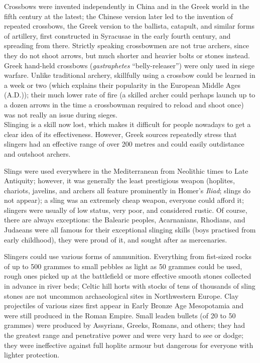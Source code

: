 \documentclass{article}
\begin{document}
Crossbows were invented independently in China and in the Greek world in the fifth century at the latest; the Chinese version later led to the invention of repeated crossbows, the Greek version to the ballista, catapult, and similar forms of artillery, first constructed in Syracusae in the early fourth century, and spreading from there. Strictly speaking crossbowmen are not true archers, since they do not shoot arrows, but much shorter and heavier bolts or stones instead. Greek hand-held crossbows (\textit{gastraphetes} ``belly-releaser'') were only used in siege warfare. Unlike traditional archery, skillfully using a crossbow could be learned in a week or two (which explains their popularity in the European Middle Ages (A.D.)); their much lower rate of fire (a skilled archer could perhaps launch up to a dozen arrows in the time a crossbowman required to reload and shoot once) was not really an issue during sieges.
\\

Slinging is a skill now lost, which makes it difficult for people nowadays to get a clear idea of its effectiveness. However, Greek sources repeatedly stress that slingers had an effective range of over 200 metres and could easily outdistance and outshoot archers. 

Slings were used everywhere in the Mediterranean from Neolithic times to Late Antiquity; however, it was generally the least prestigious weapon (hoplites, chariots, javelins, and archers all feature prominently in Homer's \textit{Iliad}; slings do not appear); a sling was an extremely cheap weapon, everyone could afford it; slingers were usually of low status, very poor, and considered rustic. Of course, there are always exceptions: the Balearic peoples, Acarnanians, Rhodians, and Judaeans were all famous for their exceptional slinging skills (boys practised from early childhood), they were proud of it, and sought after as mercenaries.

Slingers could use various forms of ammunition. Everything from fist-sized rocks of up to 500 grammes to small pebbles as light as 50 grammes could be used, rough ones picked up at the battlefield or more effective smooth stones collected in advance in river beds; Celtic hill horts with stocks of tens of thousands of sling stones are not uncommon archaeological sites in Northwestern Europe. Clay projectiles of various sizes first appear in Early Bronze Age Mesopotamia and were still produced in the Roman Empire. Small leaden bullets (of 20 to 50 grammes) were produced by Assyrians, Greeks, Romans, and others; they had the greatest range and penetrative power and were very hard to see or dodge; they were ineffective against full hoplite armour but dangerous for everyone with lighter protection.
\end{document}
